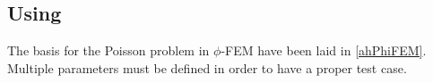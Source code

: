 \subsection{Using \phifem}

The basis for the Poisson problem in $\phi$-FEM have been laid in \eqref{ahPhiFEM}. Multiple parameters must be defined in order to have a proper test case.

    

